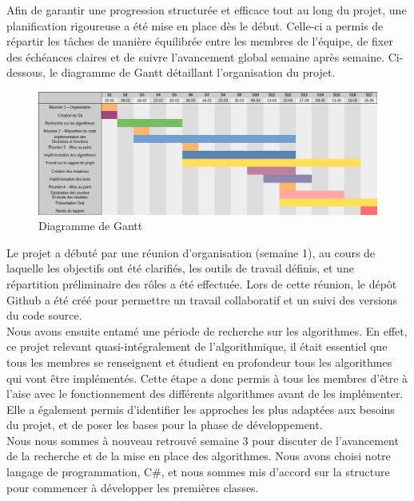 \documentclass[a4paper]{article}
\begin{document}
Afin de garantir une progression structurée et efficace tout au long du projet, une planification rigoureuse a été mise en place dès le début. Celle-ci a permis de répartir les tâches de manière équilibrée entre les membres de l'équipe, de fixer des échéances claires et de suivre l'avancement global semaine après semaine. Ci-dessous, le diagramme de Gantt détaillant l'organisation du projet.\\

\begin{figure}[h]
    \centering
    \includegraphics[width=1\textwidth]{Gantt2.png}
    \caption{Diagramme de Gantt}
    \label{fig:example}
\end{figure}

Le projet a débuté par une réunion d'organisation (semaine 1), au cours de laquelle les objectifs ont été clarifiés, les outils de travail définis, et une répartition préliminaire des rôles a été effectuée. Lors de cette réunion, le dépôt Github a été créé pour permettre un travail collaboratif et un suivi des versions du code source.\\

Nous avons ensuite entamé une période de recherche sur les algorithmes. En effet, ce projet relevant quasi-intégralement de l'algorithmique, il était essentiel que tous les membres se renseignent et étudient en profondeur tous les algorithmes qui vont être implémentés. Cette étape a donc permis à tous les membres d'être à l'aise avec le fonctionnement des différents algorithmes avant de les implémenter. Elle a également permis d'identifier les approches les plus adaptées aux besoins du projet, et de poser les bases pour la phase de développement.\\

Nous nous sommes à nouveau retrouvé semaine 3 pour discuter de l'avancement de la recherche et de la mise en place des algorithmes. Nous avons choisi notre langage de programmation, C\#, et nous sommes mis d'accord sur la structure pour commencer à développer les premières classes.\\
\end{document}
